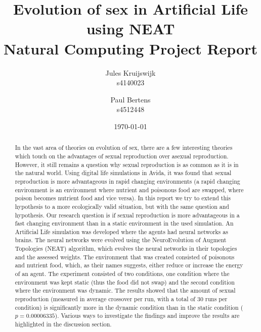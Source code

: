 \documentclass[titlepage, 12pt]{article}
\title{Evolution of sex in Artificial Life using NEAT \\ \large Natural Computing Project Report}
\author{Jules Kruijswijk \\ s4140023 \and Paul Bertens \\ s4512448}
\date{\today}
\begin{document}
\maketitle

\begin{abstract}
In the vast area of theories on evolution of sex, there are a few interesting theories which touch on the advantages of sexual reproduction over asexual reproduction.
However, it still remains a question why sexual reproduction is as common as it is in the natural world.
Using digital life simulations in Avida, it was found that sexual reproduction is more advantageous in rapid changing environments (a rapid changing environment is an environment where nutrient and poisonous food are swapped, where poison becomes nutrient food and vice versa).
In this report we try to extend this hypothesis to a more ecologically valid situation, but with the same question and hypothesis.
Our research question is if sexual reproduction is more advantageous in a fast changing environment than in a static environment in the used simulation.
An Artificial Life simulation was developed where the agents had neural networks as brains.
The neural networks were evolved using the NeuroEvolution of Augment Topologies (NEAT) algorithm, which evolves the neural networks in their topologies and the assessed weights.
The environment that was created consisted of poisonous and nutrient food, which, as their names suggests, either reduce or increase the energy of an agent.
The experiment consisted of two conditions, one condition where the environment was kept static (thus the food did not swap) and the second condition where the environment was dynamic.
The results showed that the amount of sexual reproduction (measured in average crossover per run, with a total of 30 runs per condition) is significantly more in the dynamic condition than in the static condition ($p = 0.00006335$).
Various ways to investigate the findings and improve the results are highlighted in the discussion section.
\end{abstract}

\tableofcontents
{}
\newpage











\end{document}
